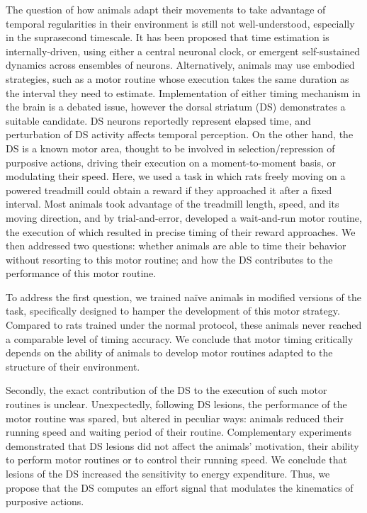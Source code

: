 The question of how animals adapt their movements to take advantage of temporal regularities in their environment is still not well-understood, especially in the suprasecond timescale.
It has been proposed that time estimation is internally-driven, using either a central neuronal clock, or emergent self-sustained dynamics across ensembles of neurons.
Alternatively, animals may use embodied strategies, such as a motor routine whose execution takes the same duration as the interval they need to estimate.
Implementation of either timing mechanism in the brain is a debated issue, however the dorsal striatum (DS) demonstrates a suitable candidate.
DS neurons reportedly represent elapsed time, and perturbation of DS activity affects temporal perception.
On the other hand, the DS is a known motor area, thought to be involved in selection/repression of purposive actions, driving their execution on a moment-to-moment basis, or modulating their speed.
Here, we used a task in which rats freely moving on a powered treadmill could obtain a reward if they approached it after a fixed interval.
Most animals took advantage of the treadmill length, speed, and its moving direction, and by trial-and-error, developed a wait-and-run motor routine, the execution of which resulted in precise timing of their reward approaches.
We then addressed two questions:
    whether animals are able to time their behavior without resorting to this motor routine;
    and how the DS contributes to the performance of this motor routine.

\par

To address the first question, we trained na\"ive animals in modified versions of the task, specifically designed to hamper the development of this motor strategy.
Compared to rats trained under the normal protocol, these animals never reached a comparable level of timing accuracy.
We conclude that motor timing critically depends on the ability of animals to develop motor routines adapted to the structure of their environment.

\par

Secondly, the exact contribution of the DS to the execution of such motor routines is unclear.
Unexpectedly, following DS lesions, the performance of the motor routine was spared, but altered in peculiar ways:
    animals reduced their running speed and waiting period of their routine.
Complementary experiments demonstrated that DS lesions did not affect the animals' motivation, their ability to perform motor routines or to control their running speed.
We conclude that lesions of the DS increased the sensitivity to energy expenditure.
Thus, we propose that the DS computes an effort signal that modulates the kinematics of purposive actions.